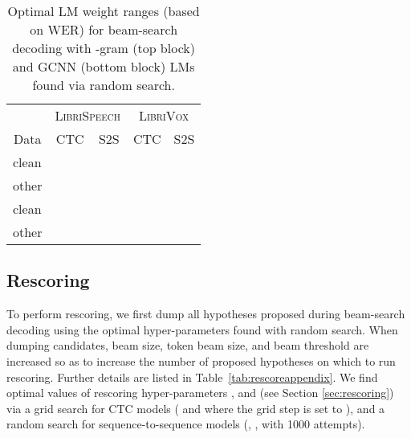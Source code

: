 \documentclass{article}
\newcommand{\librivox}{\textsc{LibriVox}}
\newcommand{\librispeech}{\textsc{LibriSpeech}}
\begin{document}
\begin{table}[h!]
\caption{Optimal LM weight ranges (based on WER) for beam-search decoding with -gram (top block) and GCNN (bottom block) LMs found via random search. \label{tab:bsdoptimalappendix} }
\vskip 0.1in
\begin{center}
\begin{small}
\begin{sc}
\begin{tabular}{lcccc}
    \toprule
    & \multicolumn{2}{c}{\librispeech{}} & \multicolumn{2}{c}{\librivox{}} \\
    \multicolumn{1}{c}{Data} & CTC & S2S & CTC & S2S \\
    \midrule
    clean &  &  &  &   \\
    other &  &  &  &  \\
    \midrule
    clean &  &  &  &  \\
    other &  &  &  &  \\
    \bottomrule
    \end{tabular}\end{sc}
\end{small}
\end{center}
\vskip -0.1in
\end{table}

\subsection{Rescoring}
To perform rescoring, we first dump all hypotheses proposed during beam-search decoding using the optimal hyper-parameters found with random search. When dumping candidates, beam size, token beam size, and beam threshold are increased so as to increase the number of proposed hypotheses on which to run rescoring. Further details are listed in Table~\ref{tab:rescoreappendix}. We find optimal values of rescoring hyper-parameters ,  and  (see Section \ref{sec:rescoring}) via a grid search for CTC models ( and  where the grid step is set to ), and a random search for sequence-to-sequence models (, ,  with 1000 attempts).
\end{document}

